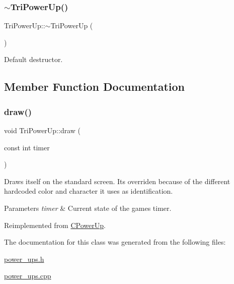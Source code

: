 \subsubsection{\texorpdfstring{$\sim$\+Tri\+Power\+Up()}{~TriPowerUp()}}
{\footnotesize\ttfamily Tri\+Power\+Up\+::$\sim$\+Tri\+Power\+Up (\begin{DoxyParamCaption}{ }\end{DoxyParamCaption})}



Default destructor. 



\subsection{Member Function Documentation}
\mbox{\label{classTriPowerUp_a06af18b739589c56a90da91716243acf}} 
\subsubsection{\texorpdfstring{draw()}{draw()}}
{\footnotesize\ttfamily void Tri\+Power\+Up\+::draw (\begin{DoxyParamCaption}\item[{const int}]{timer }\end{DoxyParamCaption})\hspace{0.3cm}{\ttfamily [virtual]}}

Draws itself on the standard screen. It\textquotesingle{}s overriden because of the different hardcoded color and character it uses as identification.


\begin{DoxyParams}{Parameters}
{\em timer} & Current state of the game\textquotesingle{}s timer. \\
\hline
\end{DoxyParams}


Reimplemented from \hyperlink{classCPowerUp_af1e0bad769efcde21858144596212e01}{C\+Power\+Up}.



The documentation for this class was generated from the following files\+:\begin{DoxyCompactItemize}
\item 
\hyperlink{power__ups_8h}{power\+\_\+ups.\+h}\item 
\hyperlink{power__ups_8cpp}{power\+\_\+ups.\+cpp}\end{DoxyCompactItemize}
